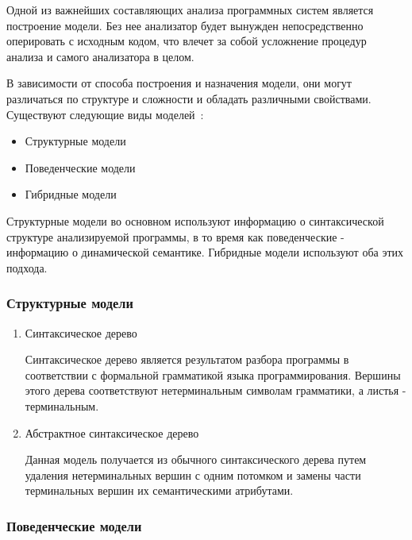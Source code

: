 Одной из важнейших составляющих анализа программных систем является построение
модели. Без нее анализатор будет вынужден непосредственно оперировать с исходным
кодом, что влечет за собой усложнение процедур анализа и самого анализатора в
целом.

В зависимости от способа построения и назначения модели, они могут различаться
по структуре и сложности и обладать различными свойствами. Существуют следующие
виды моделей~\cite{itsykson}:

\begin{itemize}
    \item Структурные модели
    \item Поведенческие модели
    \item Гибридные модели
\end{itemize}

Структурные модели во основном используют информацию о синтаксической структуре
анализируемой программы, в то время как поведенческие - информацию о
динамической семантике. Гибридные модели используют оба этих подхода.

\subsubsection{Структурные модели}
\begin{enumerate}
    \item Синтаксическое дерево

    Синтаксическое дерево является результатом разбора программы в
    соответствии с формальной грамматикой языка программирования. Вершины
    этого дерева соответствуют нетерминальным символам грамматики, а листья
    - терминальным.

    \item Абстрактное синтаксическое дерево

    Данная модель получается из обычного синтаксического дерева путем
    удаления нетерминальных вершин с одним потомком и замены части
    терминальных вершин их семантическими атрибутами.
\end{enumerate}

\subsubsection{Поведенческие модели}


